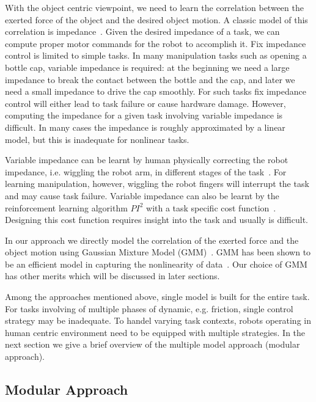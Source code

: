 With the object centric viewpoint, we need to learn the correlation between the exerted force of the object and the desired object motion. A classic model of this correlation is impedance~\cite{howard2010transferring,wimbock2012comparison}. Given the desired impedance of a task, we can compute proper motor commands for the robot to accomplish it. Fix impedance control is limited to simple tasks. In many manipulation tasks such as opening a bottle cap, variable impedance is required: at the beginning we need a large impedance to break the contact between the bottle and the cap, and later we need a small impedance to drive the cap smoothly. For such tasks fix impedance control will either lead to task failure or cause hardware damage.
However, computing the impedance for a given task involving variable impedance is difficult.
In many cases the impedance is roughly approximated by a linear model, but this is inadequate for nonlinear tasks.


Variable impedance can be learnt by human physically correcting the robot impedance, i.e. wiggling the robot arm, in different stages of the task~\cite{kronander2012online}. For learning manipulation, however, wiggling the robot fingers will interrupt the task and may cause task failure.
Variable impedance can also be learnt by the reinforcement learning algorithm $PI^2$ with a task specific cost function~\cite{buchli2011learning}. Designing this cost function requires insight into the task and usually is difficult.


In our approach we directly model the correlation of the exerted force and the object motion using Gaussian Mixture Model (GMM)~\cite{cohn1996active}. GMM has been shown to be an efficient model in capturing the nonlinearity of data~\cite{huang2013learning,sauser2011iterative,calinon2007incremental}. Our choice of GMM has other merits which will be discussed in later sections.

Among the approaches mentioned above, single model is built for the entire task. For tasks involving of multiple phases of dynamic, e.g. friction, single control strategy may be inadequate. To handel varying task contexts, robots operating in human centric environment need to be equipped with multiple strategies. In the next section we give a brief overview of the multiple model approach (modular approach).


\subsection{Modular Approach}

